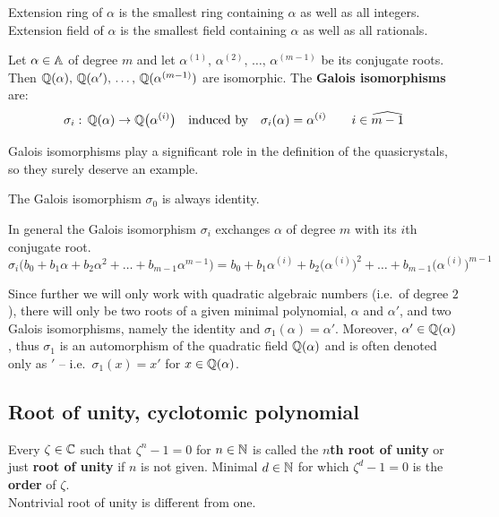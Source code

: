 \documentclass[text.tex]{subfiles}
\begin{document}
\begin{remark}
Extension ring of $\alpha$ is the smallest ring containing $\alpha$ as well as all integers. 
Extension field of $\alpha$ is the smallest field containing $\alpha$ as well as all rationals. 
\end{remark}

\begin{definition}
Let $\alpha\in\mathbb{A}$ of degree $m$ and let $\alpha^{(1)},\,\alpha^{(2)},\,\dots,\,\alpha^{(m-1)}$ be its conjugate roots. Then $\mathbb{Q}(\alpha),\, \mathbb{Q}(\alpha'),\,\dots,\, \mathbb{Q}(\alpha^{(m-1)})$ are isomorphic. The \textbf{Galois isomorphisms} are:
$$\sigma_i:\,\mathbb{Q}(\alpha)\to\mathbb{Q}\big(\alpha^{(i)}\big)\quad\text{induced by}\quad\sigma_i(\alpha) = \alpha^{(i)}\qquad i\in\widehat{m-1}$$
\end{definition}

Galois isomorphisms play a significant role in the definition of the quasicrystals, so they surely deserve an example. 

The Galois isomorphism $\sigma_0$ is always identity.

In general the Galois isomorphism $\sigma_i$ exchanges $\alpha$ of degree $m$ with its $i$th conjugate root. 
$$\sigma_i\big(b_0 + b_1\alpha + b_2\alpha^2 + \dots + b_{m-1}\alpha^{m-1}\big) = b_0 + b_1\alpha^{(i)} + b_2\big(\alpha^{(i)}\big)^2 + \dots + b_{m-1}\big(\alpha^{(i)}\big)^{m-1}$$

Since further we will only work with quadratic algebraic numbers (i.e.\ of degree $2$), there will only be two roots of a given minimal polynomial, $\alpha$ and $\alpha'$, and two Galois isomorphisms, namely the identity and $\sigma_1(\alpha) = \alpha'$. Moreover, $\alpha'\in\mathbb{Q}(\alpha)$, thus $\sigma_1$ is an automorphism of the quadratic field $\mathbb{Q}(\alpha)$ and is often denoted only as $'$ -- i.e.\ $\sigma_1(x) = x'$ for $x\in\mathbb{Q}(\alpha)$.

\subsection{Root of unity, cyclotomic polynomial}\label{sec_rootOfUnity}

\begin{definition}
Every $\zeta\in\mathbb{C}$ such that $\zeta^n-1=0$ for $n\in\mathbb{N}$ is called the \textbf{$n$th root of unity} or just \textbf{root of unity} if $n$ is not given. Minimal $d\in\mathbb{N}$ for which $\zeta^d-1=0$ is the \textbf{order} of $\zeta$. \\
Nontrivial root of unity is different from one. 
\end{definition}
\end{document}
